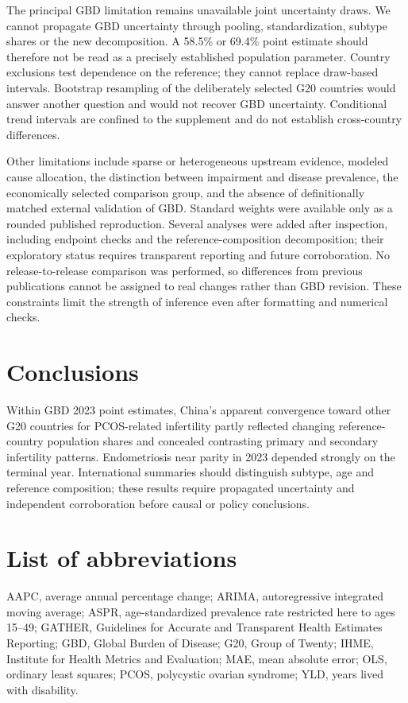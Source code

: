 \documentclass[11pt,a4paper]{article}
\begin{document}


The principal GBD limitation remains unavailable joint uncertainty draws. We cannot propagate GBD uncertainty through pooling, standardization, subtype shares or the new decomposition. A 58.5\% or 69.4\% point estimate should therefore not be read as a precisely established population parameter. Country exclusions test dependence on the reference; they cannot replace draw-based intervals. Bootstrap resampling of the deliberately selected G20 countries would answer another question and would not recover GBD uncertainty. Conditional trend intervals are confined to the supplement and do not establish cross-country differences.

Other limitations include sparse or heterogeneous upstream evidence, modeled cause allocation, the distinction between impairment and disease prevalence, the economically selected comparison group, and the absence of definitionally matched external validation of GBD. Standard weights were available only as a rounded published reproduction. Several analyses were added after inspection, including endpoint checks and the reference-composition decomposition; their exploratory status requires transparent reporting and future corroboration. No release-to-release comparison was performed, so differences from previous publications cannot be assigned to real changes rather than GBD revision. These constraints limit the strength of inference even after formatting and numerical checks.

\section{Conclusions}
Within GBD 2023 point estimates, China's apparent convergence toward other G20 countries for PCOS-related infertility partly reflected changing reference-country population shares and concealed contrasting primary and secondary infertility patterns. Endometriosis near parity in 2023 depended strongly on the terminal year. International summaries should distinguish subtype, age and reference composition; these results require propagated uncertainty and independent corroboration before causal or policy conclusions.

\section*{List of abbreviations}
AAPC, average annual percentage change; ARIMA, autoregressive integrated moving average; ASPR, age-standardized prevalence rate restricted here to ages 15--49; GATHER, Guidelines for Accurate and Transparent Health Estimates Reporting; GBD, Global Burden of Disease; G20, Group of Twenty; IHME, Institute for Health Metrics and Evaluation; MAE, mean absolute error; OLS, ordinary least squares; PCOS, polycystic ovarian syndrome; YLD, years lived with disability.
\end{document}
